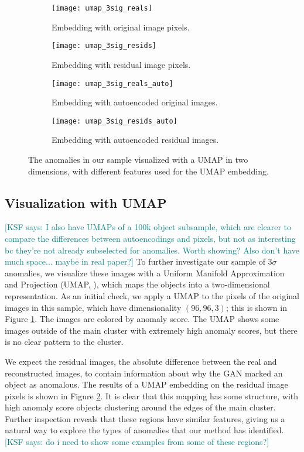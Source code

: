 \documentclass{article}
\newcommand{\sig}{$\sigma$} %
\newcommand{\KSF}[1]{\textcolor{teal}{{[KSF says: #1]}}}
\begin{document}
\begin{figure} \label{fig:umap}
\begin{subfigure}{.5\textwidth}
  \centering
  \texttt{[image: umap\_3sig\_reals]}  
  \caption{Embedding with original image pixels.}
  \label{fig:reals}
\end{subfigure}
\begin{subfigure}{.5\textwidth}
  \centering
  \texttt{[image: umap\_3sig\_resids]}  
  \caption{Embedding with residual image pixels.}
  \label{fig:resids}
\end{subfigure}

\begin{subfigure}{.5\textwidth}
  \centering
  \texttt{[image: umap\_3sig\_reals\_auto]}  
  \caption{Embedding with autoencoded original images.}
  \label{fig:reals_auto}
\end{subfigure}
\begin{subfigure}{.5\textwidth}
  \centering
  \texttt{[image: umap\_3sig\_resids\_auto]}  
  \caption{Embedding with autoencoded residual images.}
  \label{fig:resids_auto}
\end{subfigure}
\caption{The anomalies in our sample visualized with a UMAP in two dimensions, with different features used for the UMAP embedding.}
\end{figure}


\subsection{Visualization with UMAP}

\KSF{I also have UMAPs of a 100k object subsample, which are clearer to compare the differences between autoencodings and pixels, but not as interesting bc they're not already subselected for anomalies. Worth showing? Also don't have much space... maybe in real paper?}
To further investigate our sample of 3\sig anomalies, we visualize these images with a Uniform Manifold Approximation and Projection (UMAP, \citealt{McInnes2018}), which maps the objects into a two-dimensional representation.
As an initial check, we apply a UMAP to the pixels of the original images in this sample, which have dimensionality $(96,96,3)$; this is shown in Figure \ref{fig:reals}.
The images are colored by anomaly score.
The UMAP shows some images outside of the main cluster with extremely high anomaly scores, but there is no clear pattern to the cluster.

We expect the residual images, the absolute difference between the real and reconstructed images, to contain information about why the GAN marked an object as anomalous.
The results of a UMAP embedding on the residual image pixels is shown in Figure \ref{fig:resids}.
It is clear that this mapping has some structure, with high anomaly score objects clustering around the edges of the main cluster.
Further inspection reveals that these regions have similar features, giving us a natural way to explore the types of anomalies that our method has identified.
\KSF{do i need to show some examples from some of these regions?}
\end{document}
